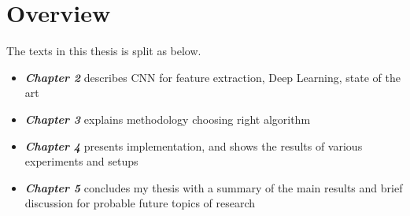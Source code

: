 \section{Overview}
The texts in this thesis is split as below.
\begin{itemize}
  \item {\textbf {\textit{Chapter 2}} describes CNN for feature extraction, Deep Learning, state of the art}
  \item {\textbf {\textit{Chapter 3}} explains methodology choosing right algorithm}
	\item {\textbf {\textit{Chapter 4}} presents implementation, and shows the results of various experiments and setups  }
	\item {\textbf {\textit{Chapter 5}} concludes my thesis with a summary of the main results and brief discussion for probable future topics of research}
\end{itemize}